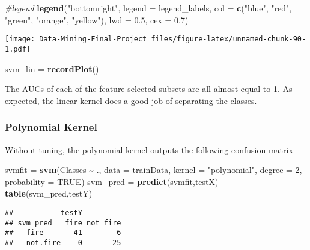 \documentclass[
]{article}
\newenvironment{Shaded}{\begin{snugshade}}{\end{snugshade}}
\newcommand{\AttributeTok}[1]{\textcolor[rgb]{0.13,0.29,0.53}{#1}}
\newcommand{\CommentTok}[1]{\textcolor[rgb]{0.56,0.35,0.01}{\textit{#1}}}
\newcommand{\ConstantTok}[1]{\textcolor[rgb]{0.56,0.35,0.01}{#1}}
\newcommand{\DecValTok}[1]{\textcolor[rgb]{0.00,0.00,0.81}{#1}}
\newcommand{\FloatTok}[1]{\textcolor[rgb]{0.00,0.00,0.81}{#1}}
\newcommand{\FunctionTok}[1]{\textcolor[rgb]{0.13,0.29,0.53}{\textbf{#1}}}
\newcommand{\NormalTok}[1]{#1}
\newcommand{\OtherTok}[1]{\textcolor[rgb]{0.56,0.35,0.01}{#1}}
\newcommand{\SpecialCharTok}[1]{\textcolor[rgb]{0.81,0.36,0.00}{\textbf{#1}}}
\newcommand{\StringTok}[1]{\textcolor[rgb]{0.31,0.60,0.02}{#1}}
\begin{document}
\begin{Shaded}
\begin{Highlighting}[]
\CommentTok{\#legend}
\FunctionTok{legend}\NormalTok{(}\StringTok{"bottomright"}\NormalTok{, }\AttributeTok{legend =}\NormalTok{ legend\_labels, }\AttributeTok{col =} \FunctionTok{c}\NormalTok{(}\StringTok{"blue"}\NormalTok{, }\StringTok{"red"}\NormalTok{, }\StringTok{"green"}\NormalTok{, }\StringTok{"orange"}\NormalTok{, }\StringTok{"yellow"}\NormalTok{), }\AttributeTok{lwd =} \FloatTok{0.5}\NormalTok{, }\AttributeTok{cex =} \FloatTok{0.7}\NormalTok{)}
\end{Highlighting}
\end{Shaded}

\texttt{[image: Data-Mining-Final-Project\_files/figure-latex/unnamed-chunk-90-1.pdf]}

\begin{Shaded}
\begin{Highlighting}[]
\NormalTok{svm\_lin }\OtherTok{=} \FunctionTok{recordPlot}\NormalTok{()}
\end{Highlighting}
\end{Shaded}

The AUCs of each of the feature selected subsets are all almost equal to
1. As expected, the linear kernel does a good job of separating the
classes.

\subsubsection{Polynomial Kernel}\label{polynomial-kernel}

Without tuning, the polynomial kernel outputs the following confusion
matrix

\begin{Shaded}
\begin{Highlighting}[]
\NormalTok{svmfit }\OtherTok{=} \FunctionTok{svm}\NormalTok{(Classes }\SpecialCharTok{\textasciitilde{}}\NormalTok{ ., }\AttributeTok{data =}\NormalTok{ trainData, }\AttributeTok{kernel =} \StringTok{"polynomial"}\NormalTok{, }\AttributeTok{degree =} \DecValTok{2}\NormalTok{, }\AttributeTok{probability =} \ConstantTok{TRUE}\NormalTok{)}
\NormalTok{svm\_pred }\OtherTok{=} \FunctionTok{predict}\NormalTok{(svmfit,testX)}
\FunctionTok{table}\NormalTok{(svm\_pred,testY)}
\end{Highlighting}
\end{Shaded}

\begin{verbatim}
##           testY
## svm_pred   fire not fire
##   fire       41        6
##   not.fire    0       25
\end{verbatim}
\end{document}
